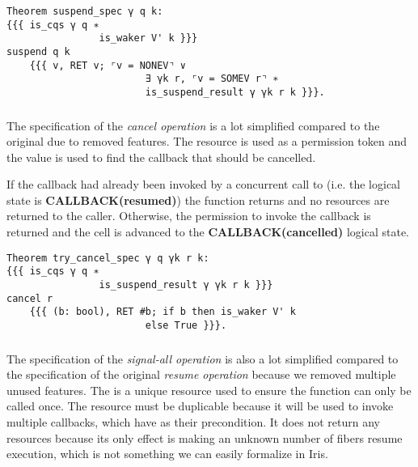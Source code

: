 \begin{verbatim}
Theorem suspend_spec γ q k:
{{{ is_cqs γ q ∗
                is_waker V' k }}}
suspend q k
    {{{ v, RET v; ⌜v = NONEV⌝ ∨
                        ∃ γk r, ⌜v = SOMEV r⌝ ∗
                        is_suspend_result γ γk r k }}}.
\end{verbatim}

\subsubsection{}
\label{sec:cqs-spec-cance}

The specification of the \emph{cancel operation} is a lot simplified compared to the original due to removed features.
The  resource is used as a permission token and the  value is used to find the callback that should be cancelled.

If the callback had already been invoked by a concurrent call to  (i.e. the logical state is \textbf{CALLBACK(resumed)}) the function returns  and no resources are returned to the caller.
Otherwise, the permission to invoke the callback is returned and the cell is advanced to the \textbf{CALLBACK(cancelled)} logical state.

\begin{verbatim}
Theorem try_cancel_spec γ q γk r k:
{{{ is_cqs γ q ∗
                is_suspend_result γ γk r k }}}
cancel r
    {{{ (b: bool), RET #b; if b then is_waker V' k
                        else True }}}.
\end{verbatim}

\subsubsection{}
\label{sec:cqs-spec-signal-all}

The specification of the \emph{signal-all operation} is also a lot simplified compared to the specification of the original \emph{resume operation} because we removed multiple unused features.
The \gssignal{} is a unique resource used to ensure the function can only be called once.
The  resource must be duplicable because it will be used to invoke multiple callbacks, which have  as their precondition.
It does not return any resources because its only effect is making an unknown number of fibers resume execution, which is not something we can easily formalize in Iris.

